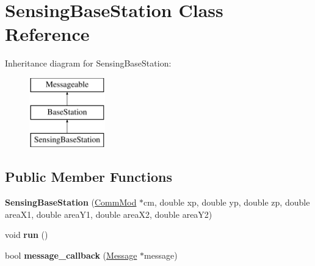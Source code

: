 \hypertarget{class_sensing_base_station}{}\section{Sensing\+Base\+Station Class Reference}
\label{class_sensing_base_station}
Inheritance diagram for Sensing\+Base\+Station\+:\begin{figure}[H]
\begin{center}
\leavevmode
\includegraphics[height=3.000000cm]{class_sensing_base_station}
\end{center}
\end{figure}
\subsection*{Public Member Functions}
\begin{DoxyCompactItemize}
\item 
{\bfseries Sensing\+Base\+Station} (\hyperlink{class_comm_mod}{Comm\+Mod} $\ast$cm, double xp, double yp, double zp, double area\+X1, double area\+Y1, double area\+X2, double area\+Y2)\hypertarget{class_sensing_base_station_a151bd0264e17d0c7df7f6be748f8f76a}{}\label{class_sensing_base_station_a151bd0264e17d0c7df7f6be748f8f76a}

\item 
void {\bfseries run} ()\hypertarget{class_sensing_base_station_ab006c613ea10104b15e007a2dac76dbd}{}\label{class_sensing_base_station_ab006c613ea10104b15e007a2dac76dbd}

\item 
bool {\bfseries message\+\_\+callback} (\hyperlink{class_message}{Message} $\ast$message)\hypertarget{class_sensing_base_station_a48c4c5fe9ea72fe9c56b757d695e6d82}{}\label{class_sensing_base_station_a48c4c5fe9ea72fe9c56b757d695e6d82}

\end{DoxyCompactItemize}
